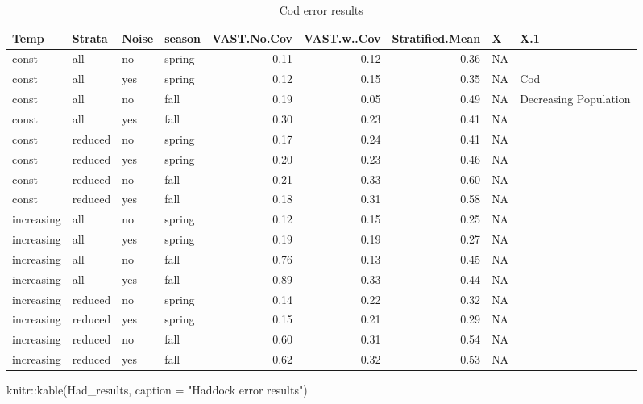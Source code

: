 \documentclass[
  12pt,
]{article}
\newenvironment{Shaded}{\begin{snugshade}}{\end{snugshade}}
\newcommand{\AttributeTok}[1]{\textcolor[rgb]{0.77,0.63,0.00}{#1}}
\newcommand{\FunctionTok}[1]{\textcolor[rgb]{0.00,0.00,0.00}{#1}}
\newcommand{\NormalTok}[1]{#1}
\newcommand{\SpecialCharTok}[1]{\textcolor[rgb]{0.00,0.00,0.00}{#1}}
\newcommand{\StringTok}[1]{\textcolor[rgb]{0.31,0.60,0.02}{#1}}
\begin{document}
\begin{table}

\caption{\label{tab:unnamed-chunk-1}Cod error results}
\centering
\begin{tabular}[t]{l|l|l|l|r|r|r|l|l}
\hline
Temp & Strata & Noise & season & VAST.No.Cov & VAST.w..Cov & Stratified.Mean & X & X.1\\
\hline
const & all & no & spring & 0.11 & 0.12 & 0.36 & NA & \\
\hline
const & all & yes & spring & 0.12 & 0.15 & 0.35 & NA & Cod\\
\hline
const & all & no & fall & 0.19 & 0.05 & 0.49 & NA & Decreasing Population\\
\hline
const & all & yes & fall & 0.30 & 0.23 & 0.41 & NA & \\
\hline
const & reduced & no & spring & 0.17 & 0.24 & 0.41 & NA & \\
\hline
const & reduced & yes & spring & 0.20 & 0.23 & 0.46 & NA & \\
\hline
const & reduced & no & fall & 0.21 & 0.33 & 0.60 & NA & \\
\hline
const & reduced & yes & fall & 0.18 & 0.31 & 0.58 & NA & \\
\hline
increasing & all & no & spring & 0.12 & 0.15 & 0.25 & NA & \\
\hline
increasing & all & yes & spring & 0.19 & 0.19 & 0.27 & NA & \\
\hline
increasing & all & no & fall & 0.76 & 0.13 & 0.45 & NA & \\
\hline
increasing & all & yes & fall & 0.89 & 0.33 & 0.44 & NA & \\
\hline
increasing & reduced & no & spring & 0.14 & 0.22 & 0.32 & NA & \\
\hline
increasing & reduced & yes & spring & 0.15 & 0.21 & 0.29 & NA & \\
\hline
increasing & reduced & no & fall & 0.60 & 0.31 & 0.54 & NA & \\
\hline
increasing & reduced & yes & fall & 0.62 & 0.32 & 0.53 & NA & \\
\hline
\end{tabular}
\end{table}

\begin{Shaded}
\begin{Highlighting}[]
\NormalTok{knitr}\SpecialCharTok{::}\FunctionTok{kable}\NormalTok{(Had\_results, }\AttributeTok{caption =} \StringTok{"Haddock error results"}\NormalTok{)}
\end{Highlighting}
\end{Shaded}
\end{document}
